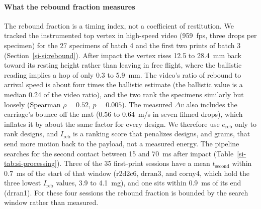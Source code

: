 \documentclass[lineno,nocopyright,upint,varvw,hyphenate]{asmejour}
\newcommand{\siref}[1]{\ref*{si-#1}}
\begin{document}
\paragraph{What the rebound fraction measures} The rebound fraction is
a timing index, not a coefficient of restitution. We tracked the
instrumented top vertex in high-speed video (\SI{959}{fps}, three drops
per specimen) for the 27 specimens of batch 4 and the first two prints
of batch 3 (Section~\siref{si:rebound}). After impact the vertex rises
12.5 to \SI{28.4}{mm} back toward its resting height rather than
leaving in free flight, where the ballistic reading implies a hop of
only 0.3 to \SI{5.9}{mm}. The video's ratio of rebound to arrival speed
is about four times the ballistic estimate (the ballistic value is a median 0.24 of the video ratio), and the
two rank the specimens similarly but loosely (Spearman $\rho = 0.52$,
$p = 0.005$). The measured $\Delta v$ also includes the carriage's
bounce off the mat (0.56 to \SI{0.64}{m/s} in seven filmed drops),
which inflates it by about the same factor for every design. We
therefore use $e_{\mathrm{reb}}$ only to rank designs, and
$I_{\mathrm{reb}}$ is a ranking score that penalizes designs, and grams,
that send more motion back to the payload, not a measured
energy. The pipeline searches for the second contact between 15 and
\SI{70}{ms} after impact (Table~\siref{tab:si-processing}). Three of the
35 first-print sessions have a mean $t_{\mathrm{second}}$ within
\SI{0.7}{ms} of the start of that window (r2d2c6, drran3, and corny4,
which hold the three lowest $I_{\mathrm{reb}}$ values, 3.9 to
\SI{4.1}{mg}), and one sits within \SI{0.9}{ms} of its end (drran1).
For these four sessions the rebound fraction is bounded by the search
window rather than measured.
\end{document}

